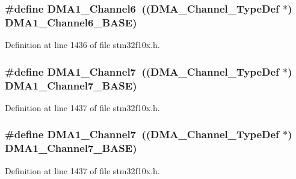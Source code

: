 \subsubsection[{\texorpdfstring{D\+M\+A1\+\_\+\+Channel6}{DMA1_Channel6}}]{\setlength{\rightskip}{0pt plus 5cm}\#define D\+M\+A1\+\_\+\+Channel6~(({\bf D\+M\+A\+\_\+\+Channel\+\_\+\+Type\+Def} $\ast$) {\bf D\+M\+A1\+\_\+\+Channel6\+\_\+\+B\+A\+SE})}\hypertarget{group___peripheral__declaration_gac013c4376e4797831b5ddd2a09519df8}{}\label{group___peripheral__declaration_gac013c4376e4797831b5ddd2a09519df8}


Definition at line 1436 of file stm32f10x.\+h.

\subsubsection[{\texorpdfstring{D\+M\+A1\+\_\+\+Channel7}{DMA1_Channel7}}]{\setlength{\rightskip}{0pt plus 5cm}\#define D\+M\+A1\+\_\+\+Channel7~(({\bf D\+M\+A\+\_\+\+Channel\+\_\+\+Type\+Def} $\ast$) {\bf D\+M\+A1\+\_\+\+Channel7\+\_\+\+B\+A\+SE})}\hypertarget{group___peripheral__declaration_ga4f9c23b3d1add93ed206b5c9afa5cda3}{}\label{group___peripheral__declaration_ga4f9c23b3d1add93ed206b5c9afa5cda3}


Definition at line 1437 of file stm32f10x.\+h.

\subsubsection[{\texorpdfstring{D\+M\+A1\+\_\+\+Channel7}{DMA1_Channel7}}]{\setlength{\rightskip}{0pt plus 5cm}\#define D\+M\+A1\+\_\+\+Channel7~(({\bf D\+M\+A\+\_\+\+Channel\+\_\+\+Type\+Def} $\ast$) {\bf D\+M\+A1\+\_\+\+Channel7\+\_\+\+B\+A\+SE})}\hypertarget{group___peripheral__declaration_ga4f9c23b3d1add93ed206b5c9afa5cda3}{}\label{group___peripheral__declaration_ga4f9c23b3d1add93ed206b5c9afa5cda3}


Definition at line 1437 of file stm32f10x.\+h.

